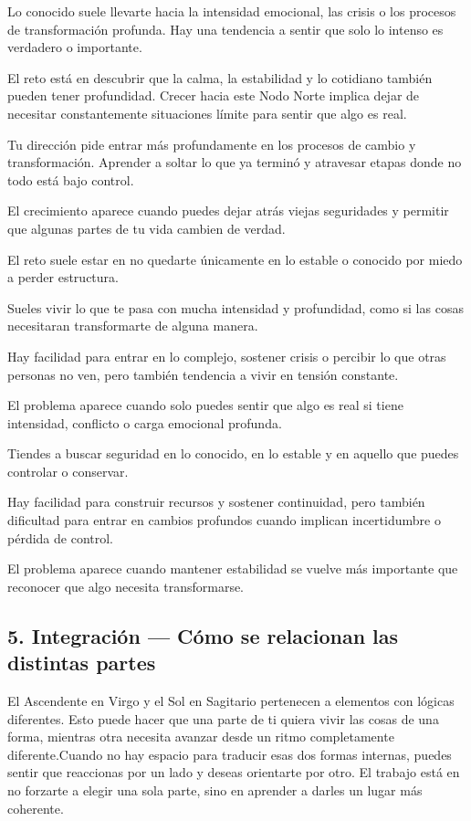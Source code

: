 \documentclass[11pt,a4paper]{article}
\begin{document}
Lo conocido suele llevarte hacia la intensidad emocional, las crisis o los procesos de transformación profunda. Hay una tendencia a sentir que solo lo intenso es verdadero o importante.

El reto está en descubrir que la calma, la estabilidad y lo cotidiano también pueden tener profundidad. Crecer hacia este Nodo Norte implica dejar de necesitar constantemente situaciones límite para sentir que algo es real.

Tu dirección pide entrar más profundamente en los procesos de cambio y transformación. Aprender a soltar lo que ya terminó y atravesar etapas donde no todo está bajo control.

El crecimiento aparece cuando puedes dejar atrás viejas seguridades y permitir que algunas partes de tu vida cambien de verdad.

El reto suele estar en no quedarte únicamente en lo estable o conocido por miedo a perder estructura.

Sueles vivir lo que te pasa con mucha intensidad y profundidad, como si las cosas necesitaran transformarte de alguna manera.

Hay facilidad para entrar en lo complejo, sostener crisis o percibir lo que otras personas no ven, pero también tendencia a vivir en tensión constante.

El problema aparece cuando solo puedes sentir que algo es real si tiene intensidad, conflicto o carga emocional profunda.

Tiendes a buscar seguridad en lo conocido, en lo estable y en aquello que puedes controlar o conservar.

Hay facilidad para construir recursos y sostener continuidad, pero también dificultad para entrar en cambios profundos cuando implican incertidumbre o pérdida de control.

El problema aparece cuando mantener estabilidad se vuelve más importante que reconocer que algo necesita transformarse.

\vspace{0.6cm}

\subsection{5. Integración — Cómo se relacionan las distintas partes}

El Ascendente en Virgo y el Sol en Sagitario pertenecen a elementos con lógicas diferentes. Esto puede hacer que una parte de ti quiera vivir las cosas de una forma, mientras otra necesita avanzar desde un ritmo completamente diferente.Cuando no hay espacio para traducir esas dos formas internas, puedes sentir que reaccionas por un lado y deseas orientarte por otro. El trabajo está en no forzarte a elegir una sola parte, sino en aprender a darles un lugar más coherente.
\end{document}
